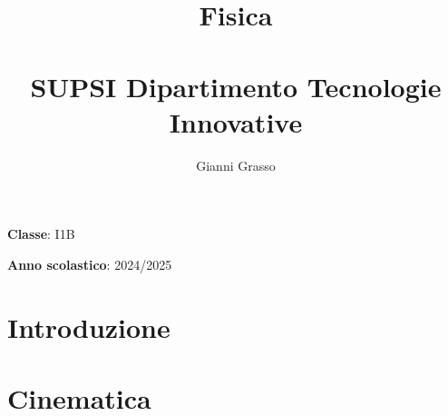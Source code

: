 \documentclass{article}
\title{
    Fisica \\
    \phantom{}\\
    \large SUPSI Dipartimento Tecnologie Innovative
}
\author{Gianni Grasso}
\begin{document}
\maketitle
\hphantom{ }
\vspace{14.5cm}

\textbf{Classe}: I1B

\textbf{Anno scolastico}: 2024/2025
\pagebreak


\tableofcontents
\pagebreak

\section{Introduzione}

\pagebreak

\section{Cinematica}

\pagebreak
\end{document}

